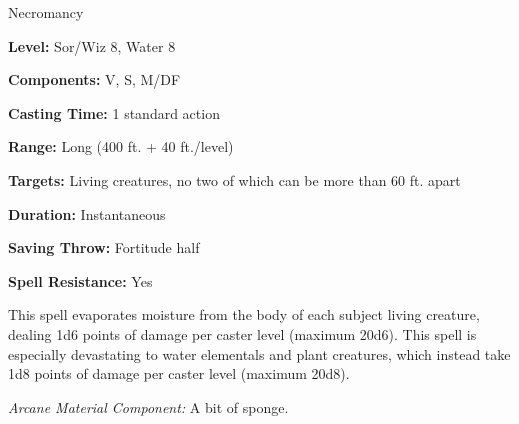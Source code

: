 
Necromancy

\textbf{Level:} Sor/Wiz 8, Water 8

\textbf{Components:} V, S, M/DF

\textbf{Casting Time:} 1 standard action

\textbf{Range:} Long (400 ft. + 40 ft./level)

\textbf{Targets:} Living creatures, no two of which can be more than 60 ft. apart

\textbf{Duration:} Instantaneous

\textbf{Saving Throw:} Fortitude half

\textbf{Spell Resistance:} Yes

This spell evaporates moisture from the body of each subject living creature, dealing 
1d6 points of damage per caster level (maximum 20d6). This spell is especially 
devastating to water elementals and plant creatures, which instead take 1d8 points 
of damage per caster level (maximum 20d8).

\textit{Arcane Material Component:} A bit of sponge.

